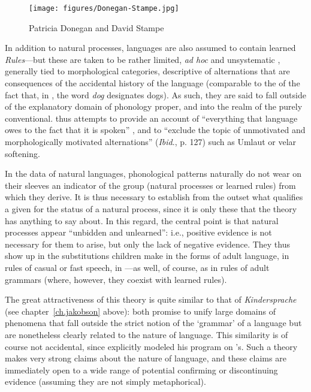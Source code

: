 \begin{wrapfigure}[12]{l}{.35\textwidth}
  \texttt{[image: figures/Donegan-Stampe.jpg]}
  \caption{Patricia Donegan and David Stampe}
  \label{fig:ch.spe.donegan-stampe}
\end{wrapfigure}
In addition to natural processes, languages are also assumed to
contain learned \textit{Rules}—but these are taken to be rather
limited, \textit{ad hoc} and unsystematic , generally tied
to morphological categories, descriptive of alternations that are
consequences of the accidental history of the language (comparable to
the  of the fact that, in , the word \textit{dog}
designates dogs). As such, they are said to fall outside of the
explanatory domain of phonology proper, and into the realm of the
purely conventional.  thus attempts to provide an
account of ``everything that language owes to the fact that it is
spoken'' \citep[128]{donegan.stampe79:study.of.np}, and to ``exclude
the topic of unmotivated and morphologically motivated alternations''
(\textit{Ibid}., p. 127) such as  Umlaut or  velar
softening.

In the data of natural languages, phonological patterns naturally do
not wear on their sleeves an indicator of the group (natural processes
or learned rules) from which they derive. It is thus necessary to
establish from the outset what qualifies a given  for the
status of a natural process, since it is only these that the theory
has anything to say about. In this regard, the central point is that
natural processes appear ``unbidden and unlearned'': i.e., positive
evidence is not necessary for them to arise, but only the lack of
negative evidence. They thus show up in the substitutions children
make in the forms of adult language, in rules of casual or fast
speech, in —as well, of course, as in rules of adult
grammars (where, however, they coexist with learned rules).

The great attractiveness of this theory is quite similar to that of
 \textsl{Kindersprache} (see
chapter~\ref{ch.jakobson} above): both promise to unify large domains
of phenomena that fall outside the strict notion of the `grammar' of a
language but are nonetheless clearly related to the nature of
language. This similarity is of course not accidental, since {\Stampe}
explicitly modeled his program on {\Jakobson}'s. Such a theory makes very
strong claims about the nature of language, and these claims are
immediately open to a wide range of potential confirming or
discontinuing evidence (assuming they are not simply metaphorical).

